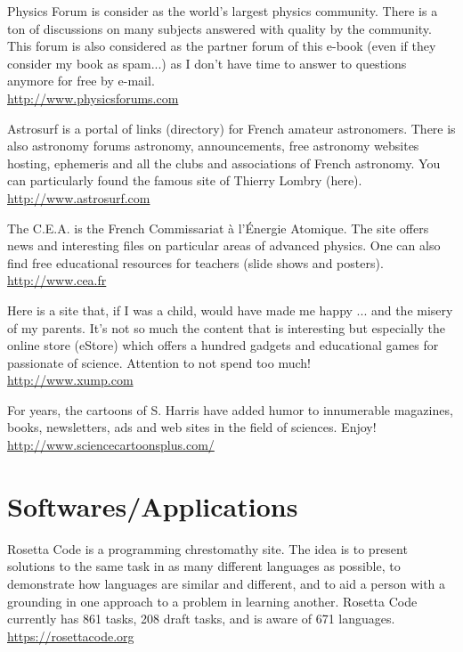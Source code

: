 	{\Large {}}{\Large {}}{\Large {}}{\Large {}}{\Large {}}\bcdfrance{} Physics Forum is consider as the world's largest physics community. There is a ton of discussions on many subjects answered with quality by the community. This forum is also considered as the partner forum of this e-book (even if they consider my book as spam...) as I don't have time to answer to questions anymore for free by e-mail. \\
	\href{http://www.physicsforums.com}{\color{blue}http://www.physicsforums.com}
	
	{\Large {}}{\Large {}}{\Large {}}{\Large {}}{\Large {}}{\Large {}}{\Large {}}{\Large {}}\bcdfrance{} Astrosurf is a portal of links (directory) for French amateur astronomers. There is also astronomy forums astronomy, announcements, free astronomy websites hosting, ephemeris and all the clubs and associations of French astronomy. You can particularly found the famous site of Thierry Lombry (here).\\
	\href{http://www.astrosurf.com}{\color{blue}http://www.astrosurf.com}
	
	{\Large {}}{\Large {}} The C.E.A. is the French Commissariat à l'Énergie Atomique. The site offers news and interesting files on particular areas of advanced physics. One can also find free educational resources for teachers (slide shows and posters).\\
	\href{http://www.cea.fr}{\color{blue}http://www.cea.fr}
	
	{\Large {}}{\Large {}} Here is a site that, if I was a child, would have made me happy ... and the misery of my parents. It's not so much the content that is interesting but especially the online store (eStore) which offers a hundred gadgets and educational games for passionate of science. Attention to not spend too much!\\
	\href{http://www.xump.com}{\color{blue}http://www.xump.com}
	
	{\Large {}}{\Large {}} For years, the cartoons of S. Harris have added humor to innumerable magazines, books, newsletters, ads and web sites in the field of sciences. Enjoy!\\
	\href{http://www.sciencecartoonsplus.com/}{\color{blue}http://www.sciencecartoonsplus.com/}
	
	\pagebreak
	\section{Softwares/Applications}
	{\Large {}}{\Large {}}{\Large {}} Rosetta Code is a programming chrestomathy site. The idea is to present solutions to the same task in as many different languages as possible, to demonstrate how languages are similar and different, and to aid a person with a grounding in one approach to a problem in learning another. Rosetta Code currently has 861 tasks, 208 draft tasks, and is aware of 671 languages.\\
	\href{https://rosettacode.org/wiki/Category:Programming_Tasks}{\color{blue}https://rosettacode.org}
	
